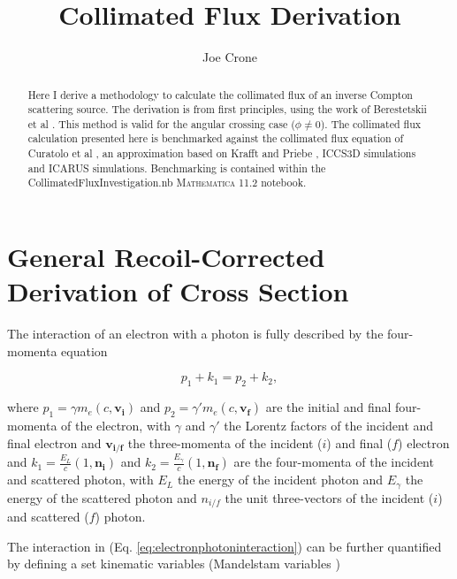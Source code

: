 \documentclass[10pt]{article}
\begin{document}
\title{Collimated Flux Derivation}
\author{Joe Crone}
\maketitle

\begin{abstract}
Here I derive a methodology to calculate the collimated flux of an inverse Compton scattering source. The derivation is from first principles, using the work of Berestetskii et al \cite{berestetskii1982quantum}. This method is valid for the angular crossing case ($\phi \neq 0$). The collimated flux calculation presented here is benchmarked against the collimated flux equation of Curatolo et al \cite{curatolo2017analytical}, an approximation based on Krafft and Priebe \cite{krafft2010compton}, \textsc{ICCS3D} \cite{ranjan2018simulation} simulations and \textsc{ICARUS} simulations. Benchmarking is contained within the CollimatedFluxInvestigation.nb \textsc{Mathematica 11.2} notebook.
\end{abstract}

\section{General Recoil-Corrected Derivation of Cross Section}

The interaction of an electron with a photon is fully described by the four-momenta equation

\begin{equation}
p_{1} + k_{1} = p_{2} + k_{2},
\label{eq:electronphotoninteraction}
\end{equation} 

where $p_{1} = \gamma m_{e}\left(c,\bm{v_{i}}\right)$ and $p_{2} = \gamma' m_{e}\left(c,\bm{v_{f}}\right)$ are the initial and final four-momenta of the electron, with $\gamma$ and $\gamma'$ the Lorentz factors of the incident and final electron and $\bm{v_{i/f}}$ the three-momenta of the incident ($i$) and final ($f$) electron and $k_{1} = \frac{E_{L}}{c}\left(1,\bm{n_{i}}\right)$ and $k_{2} = \frac{E_{\gamma}}{c}\left(1,\bm{n_{f}}\right)$ are the four-momenta of the incident and scattered photon, with $E_{L}$ the energy of the incident photon and $E_{\gamma}$ the energy of the scattered photon and $n_{i/f}$ the unit three-vectors of the incident ($i$) and scattered ($f$) photon.

The interaction in (Eq. \ref{eq:electronphotoninteraction}) can be further quantified by defining a set kinematic variables \cite{berestetskii1982quantum} (Mandelstam variables \cite{mandelstam1958determination}) 
\end{document}

